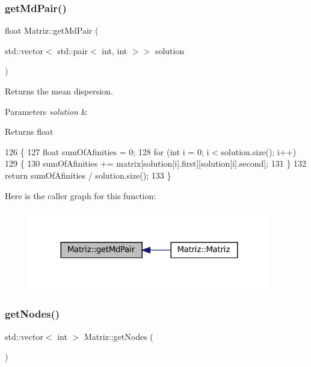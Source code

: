 \subsubsection{\texorpdfstring{get\+Md\+Pair()}{getMdPair()}}
{\footnotesize\ttfamily float Matriz\+::get\+Md\+Pair (\begin{DoxyParamCaption}\item[{std\+::vector$<$ std\+::pair$<$ int, int $>$$>$}]{solution }\end{DoxyParamCaption})}



Returns the mean dispersion. 


\begin{DoxyParams}{Parameters}
{\em solution} & \\
\hline
\end{DoxyParams}
\begin{DoxyReturn}{Returns}
float 
\end{DoxyReturn}

\begin{DoxyCode}
126 \{
127   \textcolor{keywordtype}{float} sumOfAfinities = 0;
128   \textcolor{keywordflow}{for} (\textcolor{keywordtype}{int} i = 0; i < solution.size(); i++)
129   \{
130       sumOfAfinities += matrix[solution[i].first][solution[i].second];
131   \}
132   \textcolor{keywordflow}{return} sumOfAfinities / solution.size();
133 \}
\end{DoxyCode}
Here is the caller graph for this function\+:\nopagebreak
\begin{figure}[H]
\begin{center}
\leavevmode
\includegraphics[width=300pt]{classMatriz_a61efbcc7ea661059ed0dfad32b5273cf_icgraph}
\end{center}
\end{figure}
\mbox{\label{classMatriz_a394b84a5ec13fd2f4d202ab218680afe}} 
\subsubsection{\texorpdfstring{get\+Nodes()}{getNodes()}}
{\footnotesize\ttfamily std\+::vector$<$ int $>$ Matriz\+::get\+Nodes (\begin{DoxyParamCaption}{ }\end{DoxyParamCaption})}



